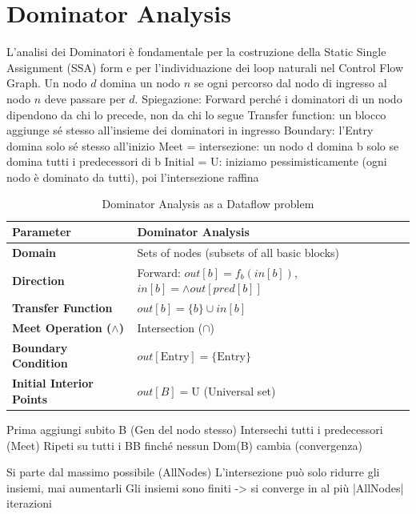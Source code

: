 \section{Dominator Analysis}

L'analisi dei Dominatori è fondamentale per la costruzione della Static Single Assignment (SSA) form e per l'individuazione dei loop naturali nel Control Flow Graph. Un nodo $d$ domina un nodo $n$ se ogni percorso dal nodo di ingresso al nodo $n$ deve passare per $d$.
Spiegazione:
Forward perché i dominatori di un nodo dipendono da chi lo precede, non da chi lo segue
Transfer function: un blocco aggiunge sé stesso all'insieme dei dominatori in ingresso
Boundary: l'Entry domina solo sé stesso all'inizio
Meet = intersezione: un nodo d domina b solo se domina tutti i predecessori di b
Initial = U: iniziamo pessimisticamente (ogni nodo è dominato da tutti), poi l'intersezione raffina
\begin{table}[H]
\centering
\renewcommand{\arraystretch}{1.5}
\begin{tabular}{ll}
\toprule
\textbf{Parameter} & \textbf{Dominator Analysis} \\
\midrule
\textbf{Domain}                    & Sets of nodes (subsets of all basic blocks) \\
\textbf{Direction}                 & Forward: $out[b] = f_b(in[b])$,\quad $in[b] = \wedge out[pred[b]]$ \\
\textbf{Transfer Function}         & $out[b] = \{b\}\cup in[b]$ \\
\textbf{Meet Operation ($\wedge$)} & Intersection ($\cap$) \\
\textbf{Boundary Condition}        & $out[\text{Entry}] = \{\text{Entry}\}$ \\
\textbf{Initial Interior Points}   & $out[B] = \text{U}$ (Universal set) \\
\bottomrule
\end{tabular}
\caption{Dominator Analysis as a Dataflow problem }
\end{table}

Prima aggiungi subito {B} (Gen del nodo stesso)
Intersechi tutti i predecessori (Meet)
Ripeti su tutti i BB finché nessun Dom(B) cambia (convergenza)

Si parte dal massimo possibile (AllNodes)
L'intersezione può solo ridurre gli insiemi, mai aumentarli
Gli insiemi sono finiti -> si converge in al più |AllNodes| iterazioni

